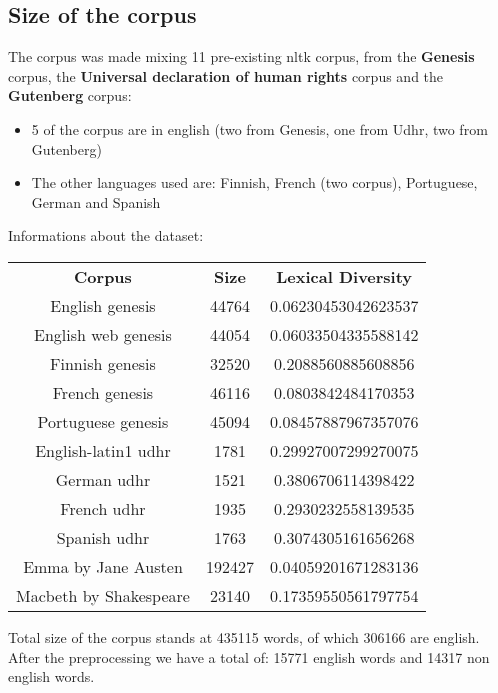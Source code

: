 \documentclass{article}
\begin{document}
        \subsection{Size of the corpus}
        The corpus was made mixing 11 pre-existing nltk corpus, from the \textbf{Genesis} corpus, the \textbf{Universal declaration of human rights} corpus and the \textbf{Gutenberg} corpus:
            \begin{itemize}
                \item 5 of the corpus are in english (two from Genesis, one from Udhr, two from Gutenberg)
                \item The other languages used are: Finnish, French (two corpus), Portuguese, German and Spanish 
            \end{itemize}
            Informations about the dataset:
                \begin{center}
                    \begin{tabular}{c|c|c}
                        \textbf{Corpus} & \textbf{Size} & \textbf{Lexical Diversity} \\
                        English genesis & 44764 & 0.06230453042623537\\
                        English web genesis & 44054 & 0.06033504335588142 \\
                        Finnish genesis & 32520 & 0.2088560885608856\\
                        French genesis & 46116 & 0.0803842484170353\\
                        Portuguese genesis & 45094 & 0.08457887967357076\\
                        English-latin1 udhr & 1781 & 0.29927007299270075\\
                        German udhr & 1521 & 0.3806706114398422\\
                        French udhr & 1935 & 0.2930232558139535\\
                        Spanish udhr & 1763 & 0.3074305161656268\\
                        Emma by Jane Austen & 192427 & 0.04059201671283136\\
                        Macbeth by Shakespeare & 23140 & 0.17359550561797754
                    \end{tabular}
                \end{center}
                Total size of the corpus stands at 435115 words, of which 306166 are english.\\
                After the preprocessing we have a total of: 15771 english words and 14317 non english words.
            
\end{document}
